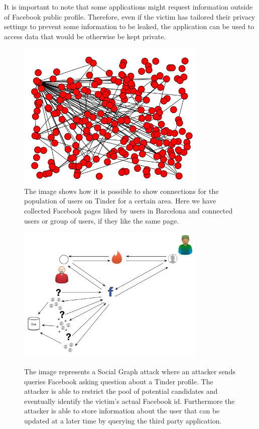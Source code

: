 It is important to note that some applications might request information outside of Facebook public profile. Therefore, even if the victim has tailored their privacy settings to prevent some information to be leaked, the application can be used to access data that would be otherwise be kept private.

\begin{figure}[t]
\centering
\includegraphics[width=90mm]{figures/figure_connections.png}
\caption[Facebook pages likes by Tinder users.]{The image shows how it is possible to show connections for the population of users on Tinder for a certain area. Here we have collected Facebook pages liked by users in Barcelona and connected users or group of users, if they like the same page.}\label{fig:connections}
\end{figure}

\begin{figure}[tb!]
\centering\hspace*{\fill}
{\includegraphics[width=90mm]{figures/attack_scenario.png}%
\label{graph}}\hspace*{\fill}
\caption[Social Graph attack]{The image represents a Social Graph attack where an attacker sends queries Facebook asking question about a Tinder profile. The attacker is able to restrict the pool of potential candidates and eventually identify the victim's actual Facebook id. Furthermore the attacker is able to store information about the user that can be updated at a later time by querying the third party application.}
\label{fig:fgs}
\end{figure}

